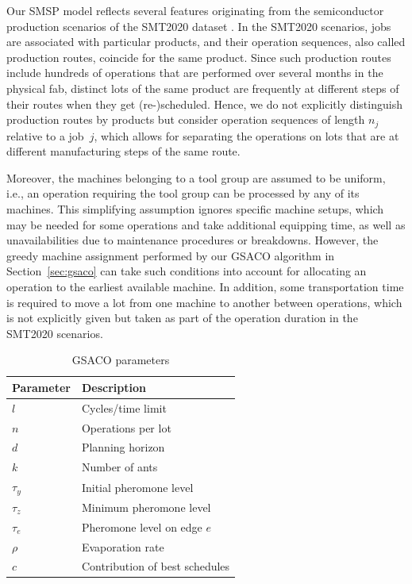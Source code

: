 \documentclass[runningheads]{llncs}
\begin{document}
Our SMSP model reflects several features originating from the
semiconductor production scenarios of the SMT2020 dataset \cite{kopp2020smt2020}.
In the SMT2020 scenarios, jobs are associated with particular products, and
their operation sequences, also called production routes,
coincide for the same product.
Since such production routes include hundreds of operations
that are performed over several months in the physical fab,
distinct lots of the same product are frequently at different
steps of their routes when they get (re-)scheduled.
Hence, we do not explicitly distinguish production routes by products
but consider operation sequences of length $n_j$ relative to a job~$j$,
which allows for separating the operations on lots that are at
different manufacturing steps of the same route.

Moreover, the machines belonging to a tool group are assumed to be uniform,
i.e., an operation requiring the tool group can be processed by any of its
machines.
This simplifying assumption ignores specific machine setups, which may be
needed for some operations and take additional equipping time,
as well as unavailabilities due to maintenance procedures or breakdowns.
However, the greedy machine assignment performed by our GSACO algorithm
in Section~\ref{sec:gsaco} can take such conditions into account for
allocating an operation to the earliest available machine.
In addition, some transportation time is required to move
a lot from one machine to another between operations,
which is not explicitly given but taken as part of the operation duration
in the SMT2020 scenarios.

\begin{table}[t]
	\caption{GSACO parameters}\label{tab:parameters} \centering
	\begin{tabular}{ll}
		\hline
		Parameter & Description \\ \hline
		$l$ & Cycles/time limit        \\
		$n$ & Operations per lot \\
		$d$ & Planning horizon \\
		$k$ & Number of ants \\
		$\tau_{y}$ & Initial pheromone level \\
		$\tau_{z}$ & Minimum pheromone level \\
		$\tau_{e}$ & Pheromone level on edge $e$ \\
		$\rho$ & Evaporation rate \\
		$c$ & Contribution of best schedules \\
		\hline
	\end{tabular}
\end{table}
\end{document}
